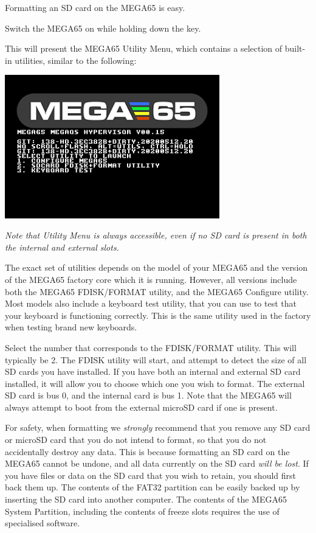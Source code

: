 Formatting an SD card on the MEGA65 is easy.

Switch the MEGA65 on while holding down the  key.

This will present the MEGA65 Utility Menu, which contains a
selection of built-in utilities, similar to the following:

\begin{center}
\includegraphics[width=0.7\textwidth]{images/ss-utilmenu.png}
\end{center}

{\em Note that Utility Menu is always accessible, even if no SD card is present in both the internal and external slots.}

The exact set of utilities
depends on the model of your MEGA65 and the version of the MEGA65
factory core which it is running. However, all versions include both
the MEGA65 FDISK/FORMAT utility, and the MEGA65 Configure utility.
Most models also include a keyboard test utility, that you can use
to test that your keyboard is functioning correctly.  This is
the same utility used in the factory when testing brand
new keyboards.

Select the number that corresponds to the FDISK/FORMAT utility.  This
will typically be 2.  The FDISK utility will start, and attempt to
detect the size of all SD cards you have installed.  If you have both
an internal and external SD card installed, it will allow you to
choose which one you wish to format. The external SD card is bus 0,
and the internal card is bus 1. Note that the MEGA65 will
always attempt to boot from the external microSD card if one is
present.

For safety, when formatting we {\em strongly} recommend
that you remove any SD card or microSD card that you do not intend to
format, so that you do not accidentally destroy any data.  This is
because formatting an SD card on the MEGA65 cannot be undone, and
all data currently on the SD card {\em will be lost}.  If you
have files or data on the SD card that you wish to retain, you
should first back them up.  The contents of the FAT32
partition can be easily backed up by inserting the SD card into
another computer.  The contents of the MEGA65 System Partition,
including the contents of freeze slots requires the use of specialised
software.

